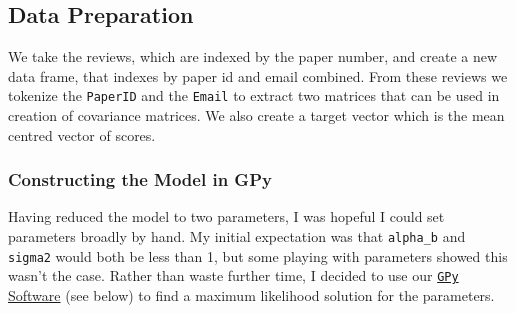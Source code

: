 \hypertarget{data-preparation}{%
\subsection{Data Preparation}\label{data-preparation}}

We take the reviews, which are indexed by the paper number, and create a
new data frame, that indexes by paper id and email combined. From these
reviews we tokenize the \texttt{PaperID} and the \texttt{Email} to
extract two matrices that can be used in creation of covariance
matrices. We also create a target vector which is the mean centred
vector of scores.

\begin{Shaded}
\begin{Highlighting}[]
\OperatorTok{=}
\OperatorTok{=}\NormalTok{\{}\NormalTok{:}\OperatorTok{=}\NormalTok{)}
\OperatorTok{=}\OperatorTok{+} \StringTok{\textquotesingle{}\_\textquotesingle{}} \OperatorTok{+}
\OperatorTok{=}
\OperatorTok{=}\NormalTok{ X1[}\OperatorTok{=}\NormalTok{)]}
\OperatorTok{=}
\OperatorTok{=}\NormalTok{ X2[}\OperatorTok{=}\NormalTok{.lower)]}
\OperatorTok{=}\OperatorTok{{-}}
\end{Highlighting}
\end{Shaded}

\hypertarget{constructing-the-model-in-gpy}{%
\subsubsection{Constructing the Model in
GPy}\label{constructing-the-model-in-gpy}}

Having reduced the model to two parameters, I was hopeful I could set
parameters broadly by hand. My initial expectation was that
\texttt{alpha\_b} and \texttt{sigma2} would both be less than 1, but
some playing with parameters showed this wasn't the case. Rather than
waste further time, I decided to use our
\href{https://github.com/SheffieldML/GPy}{\texttt{GPy} Software} (see
below) to find a maximum likelihood solution for the parameters.

